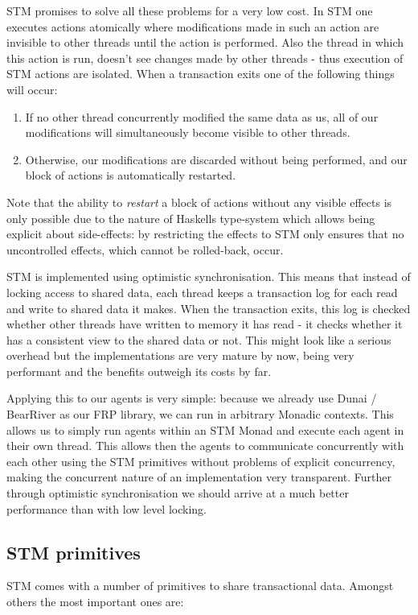 STM promises to solve all these problems for a very low cost. In STM one executes actions atomically where modifications made in such an action are invisible to other threads until the action is performed. Also the thread in which this action is run, doesn't see changes made by other threads - thus execution of STM actions are isolated. When a transaction exits one of the following things will occur:

\begin{enumerate}
	\item If no other thread concurrently modified the same data as us, all of our modifications will simultaneously become visible to other threads.
	\item Otherwise, our modifications are discarded without being performed, and our block of actions is automatically restarted.
\end{enumerate}

Note that the ability to \textit{restart} a block of actions without any visible effects is only possible due to the nature of Haskells type-system which allows being explicit about side-effects: by restricting the effects to STM only ensures that no uncontrolled effects, which cannot be rolled-back, occur.

STM is implemented using optimistic synchronisation. This means that instead of locking access to shared data, each thread keeps a transaction log for each read and write to shared data it makes. When the transaction exits, this log is checked whether other threads have written to memory it has read - it checks whether it has a consistent view to the shared data or not. This might look like a serious overhead but the implementations are very mature by now, being very performant and the benefits outweigh its costs by far.

Applying this to our agents is very simple: because we already use Dunai / BearRiver as our FRP library, we can run in arbitrary Monadic contexts. This allows us to simply run agents within an STM Monad and execute each agent in their own thread. This allows then the agents to communicate concurrently with each other using the STM primitives without problems of explicit concurrency, making the concurrent nature of an implementation very transparent. Further through optimistic synchronisation we should arrive at a much better performance than with low level locking.

\subsection{STM primitives}
STM comes with a number of primitives to share transactional data. Amongst others the most important ones are:

